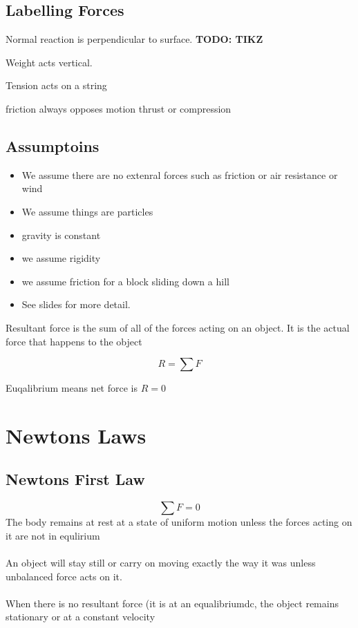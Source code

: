 \documentclass{article}
\begin{document}
\subsection{Labelling Forces}

Normal reaction is perpendicular to surface.
\textbf{TODO: TIKZ}

Weight acts vertical.

Tension acts on a string

friction always opposes motion
thrust or compression 



\subsection{Assumptoins}
\begin{itemize}
	\item We assume there are no extenral forces such as friction or air resistance or wind
	\item We assume things are particles
	\item gravity is constant
	\item we assume rigidity
	\item we assume friction for a block sliding down a hill
	\item See slides for more detail.
\end{itemize}



Resultant force is the sum of all of the forces acting on an object. It is the actual force that
happens to the object

\begin{equation}
	R = \sum F
\end{equation}


Euqalibrium means net force is $R = 0$

\section{Newtons Laws}

\subsection{Newtons First Law}
\begin{equation}
	\sum F = 0
\end{equation}
The body remains at rest at a state of uniform motion unless the forces acting on it are not in equlirium
\\\\
An object will stay still or carry on moving exactly the way it was unless unbalanced force acts on it.
\\\\
When there is no resultant force (it is at an equalibriumdc, the object remains stationary or at a constant velocity
\end{document}
